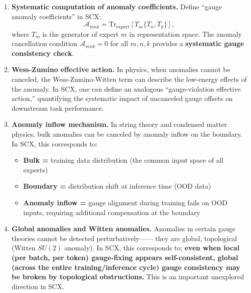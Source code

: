 \documentclass[12pt,a4paper]{article}
\theoremstyle{remark}
\newcommand{\Tr}{\mathrm{Tr}}
\begin{document}
\begin{enumerate}[label=\textbf{(A\arabic*)}]
    \item \textbf{Systematic computation of anomaly coefficients.} Define ``gauge anomaly coefficients'' in SCX:
    \begin{equation}
        \mathcal{A}_{mnk} = \Tr_{\text{expert}}[T_m\{T_n, T_k\}],
    \end{equation}
    where $T_m$ is the generator of expert $m$ in representation space. The anomaly cancellation condition $\mathcal{A}_{mnk} = 0$
    for all $m,n,k$ provides a \textbf{systematic gauge consistency check}.

    \item \textbf{Wess-Zumino effective action.} In physics, when anomalies cannot be canceled,
    the Wess-Zumino-Witten term can describe the low-energy effects of the anomaly. In SCX, one can define an analogous
    ``gauge-violation effective action,'' quantifying the systematic impact of uncanceled gauge offsets on downstream task performance.

    \item \textbf{Anomaly inflow mechanism.} In string theory and condensed matter physics, bulk anomalies can be canceled by anomaly inflow on the boundary. In SCX, this corresponds to:
    \begin{itemize}
        \item \textbf{Bulk =} training data distribution (the common input space of all experts)
        \item \textbf{Boundary =} distribution shift at inference time (OOD data)
        \item \textbf{Anomaly inflow =} gauge alignment during training fails on OOD inputs,
        requiring additional compensation at the boundary
    \end{itemize}

    \item \textbf{Global anomalies and Witten anomalies.} Anomalies in certain gauge theories cannot be detected perturbatively——
    they are global, topological (Witten $SU(2)$ anomaly). In SCX, this corresponds to:
    \textbf{even when local (per batch, per token) gauge-fixing appears self-consistent,
    global (across the entire training/inference cycle) gauge consistency may be broken by topological obstructions.}
    This is an important unexplored direction in SCX.
\end{enumerate}

\end{document}
